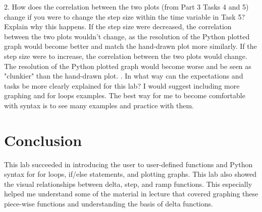 \documentclass[12pt]{article}
\begin{document}
2. How does the correlation between the two plots (from Part 3 Tasks 4 and 5) change if you were to change the step size within the time variable in Task 5? Explain why this happens.
\newline
If the step size were decreased, the correlation between the two plots wouldn't change, as the resolution of the Python plotted graph would become better and match the hand-drawn plot more similarly.
If the step size were to increase, the correlation between the two plots would change. The resolution of the Python plotted graph would become worse and be seen as "clunkier" than the hand-drawn plot.
. In what way can the expectations and tasks be more clearly explained for this lab? \newline
I would suggest including more graphing and for loops examples. The best way for me to become comfortable with syntax is to see many examples and practice with them.
\newline

\section{Conclusion}
This lab succeeded in introducing the user to user-defined functions and Python syntax for for loops, if/else statements, and plotting graphs. This lab also showed the visual relationships between delta, step, and ramp functions.
This especially helped me understand some of the material in lecture that covered graphing these piece-wise functions and understanding the basis of delta functions.
\end{document}
